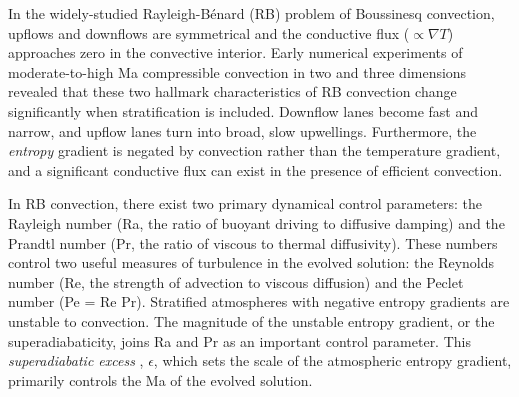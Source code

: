 \documentclass[aps, prl, twocolumn, nofootinbib, groupedaddress, amsfonts, amssymb, amsmath]{revtex4-1}
\newcommand{\grad}{\ensuremath{\nabla}}
\newcommand{\RB}{Rayleigh-B\'{e}nard }
\begin{document}

In the widely-studied \RB (RB) problem of Boussinesq convection, 
upflows and downflows are symmetrical and
the conductive flux ($\propto \grad T$) approaches 
zero in the convective interior.
Early numerical experiments of moderate-to-high Ma compressible convection
in two \cite{graham1975, chan&all1982,
hurlburt&all1984, cattaneo&all1990} and three 
\cite{cattaneo&all1991, brummell&all1996} dimensions
revealed that these two hallmark characteristics of RB convection change
significantly when stratification is included.  Downflow lanes
become fast and narrow, and upflow lanes turn into broad, slow upwellings.
Furthermore, the \emph{entropy} gradient is negated by convection 
rather than the temperature gradient, and
a significant conductive flux can exist in the presence of
efficient convection.

In RB convection, there exist two primary dynamical control parameters: 
the Rayleigh number (Ra, the ratio of
buoyant driving to diffusive damping) and the Prandtl number 
(Pr, the ratio of viscous to thermal
diffusivity). These numbers control two useful
measures of turbulence in the evolved solution:
the Reynolds
number (Re, the strength of advection to viscous diffusion)
and the Peclet number (Pe = Re Pr).  Stratified atmospheres
with negative entropy gradients are unstable to convection.
The magnitude of the unstable entropy gradient, or the superadiabaticity,
joins Ra and Pr as an important control parameter.  This 
\emph{superadiabatic excess} \cite{graham1975}, $\epsilon$, which 
sets the scale of the atmospheric entropy gradient,
primarily controls the Ma of the evolved solution.
\end{document}
